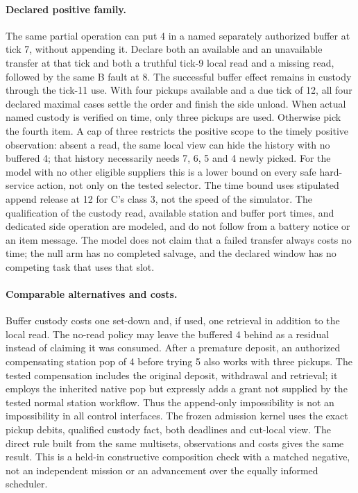 \documentclass{article}
\begin{document}
\paragraph{Declared positive family.}
The same partial operation can put 4 in a named separately authorized
buffer at tick 7, without appending it. Declare both an available and
an unavailable transfer at that tick and both a truthful tick-9
local read and a missing read, followed by the same B fault at 8.
The successful buffer effect remains in custody through the tick-11
use. With four pickups available and a due tick of 12, all four
declared maximal cases settle the order and finish the side unload.
When actual named custody is verified on time, only three pickups
are used. Otherwise pick the fourth item. A cap of three restricts
the positive scope to the timely positive observation: absent a read,
the same local view can hide the history with no buffered 4; that
history necessarily needs 7, 6, 5 and 4 newly picked. For the model
with no other eligible suppliers this is a lower bound on every
safe hard-service action, not only on the tested selector. The
time bound uses stipulated append release at 12 for C's class 3,
not the speed of the simulator. The qualification of the
custody read, available station and buffer port times, and
dedicated side operation are modeled, and do not follow from a
battery notice or an item message. The model does not claim that
a failed transfer always costs no time; the null arm has no
completed salvage, and the declared window has no competing
task that uses that slot.

\paragraph{Comparable alternatives and costs.}
Buffer custody costs one set-down and, if used, one retrieval in
addition to the local read. The no-read policy may leave the
buffered 4 behind as a residual instead of claiming it was consumed.
After a premature deposit, an authorized compensating station pop
of 4 before trying 5 also works with three pickups. The tested
compensation includes the original deposit, withdrawal and retrieval;
it employs the inherited native pop but expressly adds a grant
not supplied by the tested normal station workflow. Thus the
append-only impossibility is not an impossibility in all control
interfaces. The frozen admission kernel uses the exact pickup
debits, qualified custody fact, both deadlines and cut-local view.
The direct rule built from the same multisets, observations and
costs gives the same result. This is a held-in constructive
composition check with a matched negative, not an independent
mission or an advancement over the equally informed scheduler.
\end{document}
